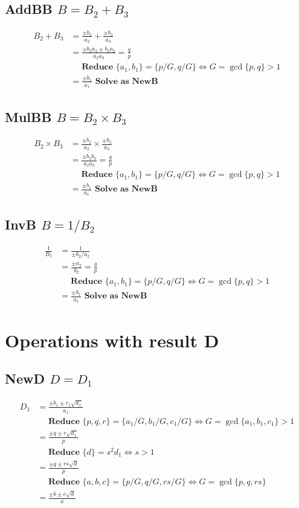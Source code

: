 \documentclass{article}
\begin{document}
\subsection{AddBB $B = B_2 + B_3$}
\begin{align}
B_2 + B_3 &= \frac{\pm b_2}{a_2} + \frac{\pm b_3}{a_3} \\
 &= \frac{\pm b_2a_3 \pm b_3a_2 }{a_2a_3} = \frac{q}{p} \\
 &\quad \textbf{ Reduce } \{ a_1,b_1 \} = \{p/G, q/G\} \iff G = \gcd \{ p,q \} > 1 \nonumber \\
 &= \frac{\pm b_1 }{ a_1 } \textbf{ Solve as NewB }
\end{align}

\subsection{MulBB $B = B_2 \times B_3$}
\begin{align}
B_2 \times B_3 &= \frac{\pm b_2}{a_2} \times \frac{\pm b_3}{a_3} \\
  &= \frac{\pm b_2b_3}{a_2a_3} = \frac{q}{p} \\
 &\quad \textbf{ Reduce } \{ a_1,b_1 \} = \{p/G, q/G\} \iff G = \gcd \{ p,q \} > 1 \nonumber \\
 &= \frac{\pm b_1 }{ a_1 } \textbf{ Solve as NewB }
\end{align}

\subsection{InvB $B = 1 / B_2$}
\begin{align}
\frac{1}{B_2} &= \frac{1}{\pm b_2 / a_2}\\
 &= \frac{\pm a_2}{b_2} = \frac{q}{p} \\
 &\quad \textbf{ Reduce } \{ a_1,b_1 \} = \{p/G, q/G\} \iff G = \gcd \{ p,q \} > 1 \nonumber \\
 &= \frac{\pm b_1 }{ a_1 } \textbf{ Solve as NewB }
\end{align}

\section{Operations with result D}

\subsection{NewD $D = D_1$}
\begin{align}
D_1 &= \frac{\pm b_1 \pm c_1\sqrt{d_1}}{a_1}\\
 &\quad \textbf{ Reduce } \{p,q,r\} = \{a_1/G,b_1/G,c_1/G\} \iff G = \gcd \{a_1,b_1,c_1\} > 1 \nonumber \\
 &= \frac{\pm q \pm r\sqrt{d_1}}{p} \\
 &\quad \textbf{ Reduce } \{ d \} = s^2d_1 \iff s>1 \nonumber \\
 &= \frac{\pm q \pm rs\sqrt{d}}{p}\\
 &\quad \textbf{ Reduce } \{a,b,c\} = \{p/G,q/G,rs/G\} \iff G = \gcd \{p,q,rs\} \nonumber \\
 &= \frac{\pm b \pm c\sqrt{d}}{a}
\end{align}
\end{document}
